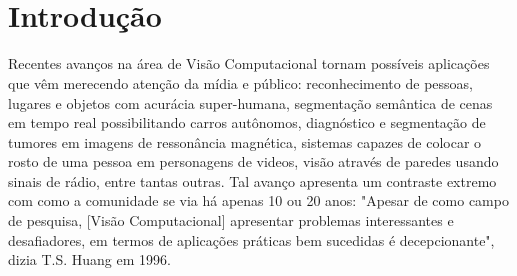 \documentclass[
12pt, %
a4paper, %
onecolumn, %
]{article}
\begin{document}
\pagestyle{myheadings} %


\thispagestyle{plain} %

\printcover %

\begin{center}

  \horrule{0.5pt} \\[0.4cm] %

  \bigskip

  \textbf{\Large{\doctitle}}
  
  \bigskip
  
  \docauthor

  \bigskip
  

  \horrule{2pt} \\[0.5cm] %

\end{center}

\thispagestyle{plain}
\setcounter{page}{2}
\onehalfspacing

\section{Introdução}


Recentes avanços na área de Visão Computacional tornam possíveis aplicações que vêm merecendo atenção da mídia e público: reconhecimento de pessoas, lugares e objetos com acurácia super-humana, segmentação semântica de cenas em tempo real possibilitando carros autônomos, diagnóstico e segmentação de tumores em imagens de ressonância magnética, sistemas capazes de colocar o rosto de uma pessoa em personagens de videos, visão através de paredes usando sinais de rádio, entre tantas outras. Tal avanço apresenta um contraste extremo com como a comunidade se via há apenas 10 ou 20 anos: "Apesar de como campo de pesquisa, [Visão Computacional] apresentar problemas interessantes e desafiadores, em termos de aplicações práticas bem sucedidas é decepcionante"\cite{huang1996}, dizia T.S. Huang em 1996.  
\end{document}
